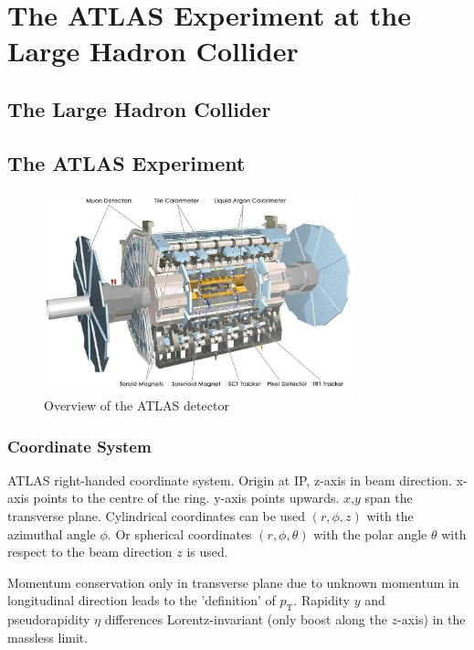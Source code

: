 \chapter{The ATLAS Experiment at the Large Hadron Collider}
\label{chap:atlas}

\section{The Large Hadron Collider}
\label{sec:lhc}

\section{The ATLAS Experiment}
\label{sec:atlas}

\begin{figure}[ht]
  \centering
  \includegraphics[width=0.8\textwidth]{./figures/atlas/overview.jpg}
  \caption{Overview of the ATLAS detector\cite{atlas_detector}}
  \label{fig:atlas_indet}
\end{figure}

\cite{atlas_detector}

\subsection{Coordinate System}
\label{sec:atlas_coord_sys}

ATLAS right-handed coordinate system. Origin at IP, z-axis in beam direction.
x-axis points to the centre of the ring. y-axis points upwards. $x$,$y$ span the
transverse plane. Cylindrical coordinates can be used $(r, \phi, z)$ with the
azimuthal angle $\phi$. Or spherical coordinates $(r, \phi, \theta)$ with the
polar angle $\theta$ with respect to the beam direction $z$ is used.

Momentum conservation only in transverse plane due to unknown momentum in
longitudinal direction leads to the 'definition' of $p_\text{T}$. Rapidity $y$
and pseudorapidity $\eta$ differences Lorentz-invariant (only boost along the
$z$-axis) in the massless limit.

